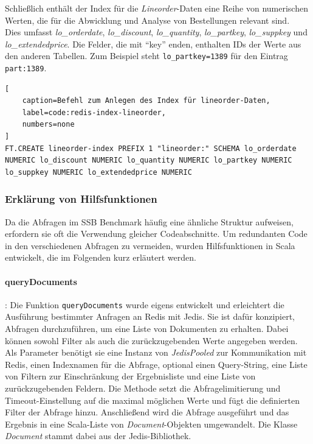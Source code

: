 Schließlich enthält der Index für die \emph{Lineorder}-Daten eine Reihe von numerischen Werten, die für die Abwicklung und Analyse von Bestellungen relevant sind.\\
Dies umfasst \emph{lo\_orderdate}, \emph{lo\_discount}, \emph{lo\_quantity}, \emph{lo\_partkey}, \emph{lo\_suppkey} und \emph{lo\_extendedprice}. Die Felder, die mit \enquote{key} enden, enthalten IDs der Werte aus den anderen Tabellen. Zum Beispiel steht \lstinline|lo_partkey=1389| für den Eintrag \lstinline|part:1389|.

\begin{lstlisting}[
    caption=Befehl zum Anlegen des Index für lineorder-Daten,
    label=code:redis-index-lineorder,
    numbers=none
]
FT.CREATE lineorder-index PREFIX 1 "lineorder:" SCHEMA lo_orderdate NUMERIC lo_discount NUMERIC lo_quantity NUMERIC lo_partkey NUMERIC lo_suppkey NUMERIC lo_extendedprice NUMERIC
\end{lstlisting}


\subsubsection{Erklärung von Hilfsfunktionen}\label{sec:redis-scale-helper}
Da die Abfragen im SSB Benchmark häufig eine ähnliche Struktur aufweisen, erfordern sie oft die Verwendung gleicher Codeabschnitte. Um redundanten Code in den verschiedenen Abfragen zu vermeiden, wurden Hilfsfunktionen in Scala entwickelt, die im Folgenden kurz erläutert werden.

\paragraph{queryDocuments}: Die Funktion \lstinline|queryDocuments| wurde eigens entwickelt und erleichtert die Ausführung bestimmter Anfragen an Redis mit Jedis. Sie ist dafür konzipiert, Abfragen durchzuführen, um eine Liste von Dokumenten zu erhalten. Dabei können sowohl Filter als auch die zurückzugebenden Werte angegeben werden. Als Parameter benötigt sie eine Instanz von \emph{JedisPooled} zur Kommunikation mit Redis, einen Indexnamen für die Abfrage, optional einen Query-String, eine Liste von Filtern zur Einschränkung der Ergebnisliste und eine Liste von zurückzugebenden Feldern. Die Methode setzt die Abfragelimitierung und Timeout-Einstellung auf die maximal möglichen Werte und fügt die definierten Filter der Abfrage hinzu. Anschließend wird die Abfrage ausgeführt und das Ergebnis in eine Scala-Liste von \emph{Document}-Objekten umgewandelt. Die Klasse \emph{Document} stammt dabei aus der Jedis-Bibliothek.

